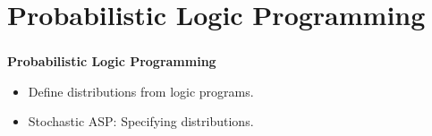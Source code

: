 \documentclass[bigger]{beamer}
\begin{document}
\section{Probabilistic Logic Programming}
%
%
\begin{frame}
    \frametitle{}
    \vfill
    \begin{center}
        {\huge\bf Probabilistic Logic Programming}
    \end{center}
    \vfill
    \begin{itemize}
        \item Define distributions from logic programs.
        \item Stochastic ASP: Specifying distributions.
    \end{itemize}
    \vfill
\end{frame}
%
\end{document}
